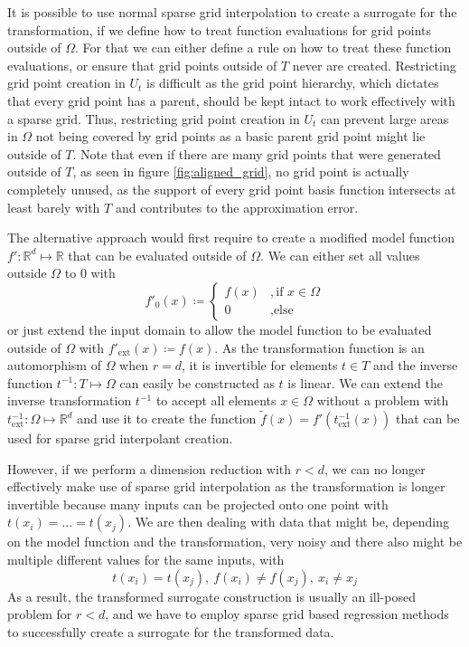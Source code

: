 \documentclass[
  a4paper,  %
  twoside,  %
  bibliography=totoc,
  headsepline,
  cleardoublepage=empty,
  parskip=half,
  draft=false
]{scrbook}
\begin{document}
It is possible to use normal sparse grid interpolation to create a surrogate for the transformation, if we define how to treat function evaluations for grid points outside of $\Omega$.
For that we can either define a rule on how to treat these function evaluations, or ensure that grid points outside of $T$ never are created.
Restricting grid point creation in $U_t$ is difficult as the grid point hierarchy, which dictates that every grid point has a parent, should be kept intact to work effectively with a sparse grid.
Thus, restricting grid point creation in $U_t$ can prevent large areas in $\Omega$ not being covered by grid points as a basic parent grid point might lie outside of $T$.
Note that even if there are many grid points that were generated outside of $T$, as seen in figure \cref{fig:aligned_grid}, no grid point is actually completely unused, as the support of every grid point basis function intersects at least barely with $T$ and contributes to the approximation error.

The alternative approach would first require to create a modified model function $f' \colon \mathds{R}^d \mapsto \mathds{R}$ that can be evaluated outside of $\Omega$.
We can either set all values outside $\Omega$ to 0 with
\begin{equation}
f'_0(x) \coloneqq \begin{cases}
f(x)&, \text{if $x \in \Omega$}\\
0&,\text{else}
\end{cases}
\end{equation}
or just extend the input domain to allow the model function to be evaluated outside of $\Omega$ with $f'_{\text{ext}}(x) \coloneqq f(x)$.
As the transformation function is an automorphism of $\Omega$ when $r=d$, it is invertible for elements $t \in T$ and the inverse function $t^{-1} \colon T \mapsto \Omega$ can easily be constructed as $t$ is linear.
We can extend the inverse transformation $t^{-1}$ to accept all elements $x \in \Omega$ without a problem with $t^{-1}_{\text{ext}} \colon \Omega \mapsto \mathds{R}^d$ and use it to create the function $\tilde{f}(x)=f'(t^{-1}_{\text{ext}}(x))$ that can be used for sparse grid interpolant creation.

However, if we perform a dimension reduction with $r < d$, we can no longer effectively make use of sparse grid interpolation as the transformation is longer invertible because many inputs can be projected onto one point with $t(x_i)=\dots=t(x_j)$.
We are then dealing with data that might be, depending on the model function and the transformation, very noisy and there also might be multiple different values for the same inputs, with
\begin{equation}
t(x_i)=t(x_j), ~ f(x_i) \neq f(x_j), ~ x_i \neq x_j
\end{equation}
As a result, the transformed surrogate construction is usually an ill-posed problem for $r < d$, and we have to employ sparse grid based regression methods to successfully create a surrogate for the transformed data.
\end{document}
